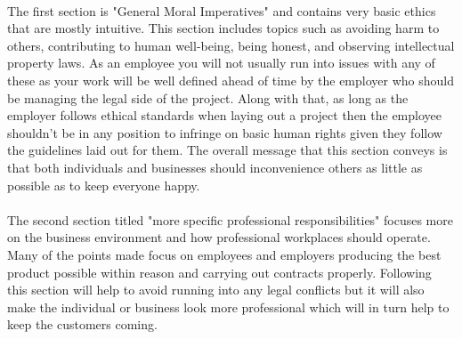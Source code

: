 \documentclass[a4paper,12pt]{article}
\begin{document}
\paragraph{}The first section is "General Moral Imperatives" and contains very basic ethics that are mostly intuitive. This section includes topics such as avoiding harm to others, contributing to human well-being, being honest, and observing intellectual property laws. As an employee you will not usually run into issues with any of these as your work will be well defined ahead of time by the employer who should be managing the legal side of the project. Along with that, as long as the employer follows ethical standards when laying out a project then the employee shouldn't be in any position to infringe on basic human rights given they follow the guidelines laid out for them. The overall message that this section conveys is that both individuals and businesses should inconvenience others as little as possible as to keep everyone happy.
\paragraph{}The second section titled "more specific professional responsibilities" focuses more on the business environment and how professional workplaces should operate. Many of the points made focus on employees and employers producing the best product possible within reason and carrying out contracts properly. Following this section will help to avoid running into any legal conflicts but it will also make the individual or business look more professional which will in turn help to keep the customers coming.
\end{document}
